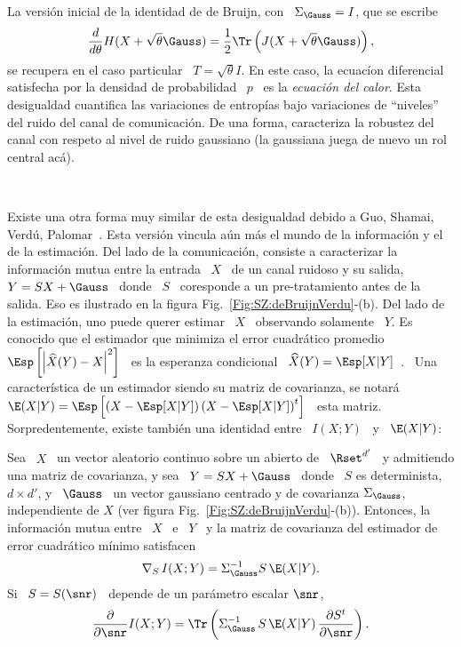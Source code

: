La versi\'on  inicial de la identidad de  de Bruijn, con \  $\Sigma_\Gauss = I$,
que se escribe
%
\[
\frac{d}{d\theta}     H(X+\sqrt{\theta}    \Gauss)    =     \frac12    \Tr\left(
  J(X+\sqrt{\theta} \Gauss) \right),
\]
%
se recupera  en el caso particular  \ $T =  \sqrt{\theta} I$.  En este  caso, la
ecuac\'ion diferencial satisfecha por la densidad  de probabilidad \ $p$ \ es la
{\it  ecuaci\'on del  calor}.  Esta  desigualdad cuantifica  las  variaciones de
entrop\'ias   bajo  variaciones   de  ``niveles''   del  ruido   del   canal  de
comunicaci\'on. De una  forma, caracteriza la robustez del  canal con respeto al
nivel de ruido gaussiano (la gaussiana juega de nuevo un rol central ac\'a).

\

Existe una  otra forma  muy similar  de esta desigualdad  debido a  Guo, Shamai,
Verd\'u,  Palomar~\cite{GuoSha05, PalVer06,  TorZoz18}.  Esta  versi\'on vincula
a\'un m\'as el mundo  de la informaci\'on y el de la  estimaci\'on.  Del lado de
la  comunicaci\'on, consiste  a  caracterizar la  informaci\'on  mutua entre  la
entrada \ $X$ \ de un canal ruidoso y su  salida, \ $Y = S X + \Gauss$ \ donde \
$S$ \ coresponde a un pre-tratamiento antes de la salida. Eso es ilustrado en la
figura  Fig.~\ref{Fig:SZ:deBruijnVerdu}-(b).  Del lado  de la  estimaci\'on, uno
puede querer  estimar \ $X$  \ observando solamente  \ $Y$.  Es conocido  que el
estimador  que minimiza  el error  cuadr\'atico promedio  \  $\Esp\left[ \left|
    \widehat{X}(Y)  - X  \right|^2 \right]$  \  es la  esperanza condicional  \
$\widehat{X}(Y)   =    \Esp[X|Y]$~\cite{Kay93,   Rob07,   LehCas98}.     \   Una
caracter\'istica de un  estimador siendo su matriz de  covarianza, se notar\'a \
$\E(X|Y)  =  \Esp\left[  \left( X  -  \Esp[X|Y]  \right)  \left( X  -  \Esp[X|Y]
  \right)^t  \right]$ \  esta  matriz.  Sorpredentemente,  existe tambi\'en  una
identidad entre \ $I(X;Y)$ \ y \ $\E(X|Y)$:
%
\begin{teorema}[Identidad de Guo--Shamai--Verd\'u]
  Sea \ $X$ \ un vector aleatorio  continuo sobre un abierto de \ $\Rset^{d'}$ \
  y admitiendo una  matriz de covarianza, y sea \  $Y = S X +  \Gauss$ \ donde \
  $S$  es determinista,  $d  \times d'$,  y  \ $\Gauss$  \  un vector  gaussiano
  centrado  y de covarianza  $\Sigma_\Gauss$, independiente  de $X$  (ver figura
  Fig.~\ref{Fig:SZ:deBruijnVerdu}-(b)). Entonces, la informaci\'on mutua entre \
  $X$ \ e \ $Y$ \ y  la matriz de covarianza del estimador de error cuadr\'atico
  m\'inimo satisfacen
  \[
  \nabla_S \, I(X;Y) = \Sigma_\Gauss^{-1} S \, \E(X|Y).
  \]
  Si \ $S = S(\snr)$ \ depende de un par\'ametro escalar $\snr$,
  \[
  \frac{\partial}{\partial \snr} I(X;Y) = \Tr\left( \Sigma_\Gauss^{-1} \, S \,
    \E(X|Y) \, \frac{\partial S^t}{\partial \snr} \right).
  \]
\end{teorema}
